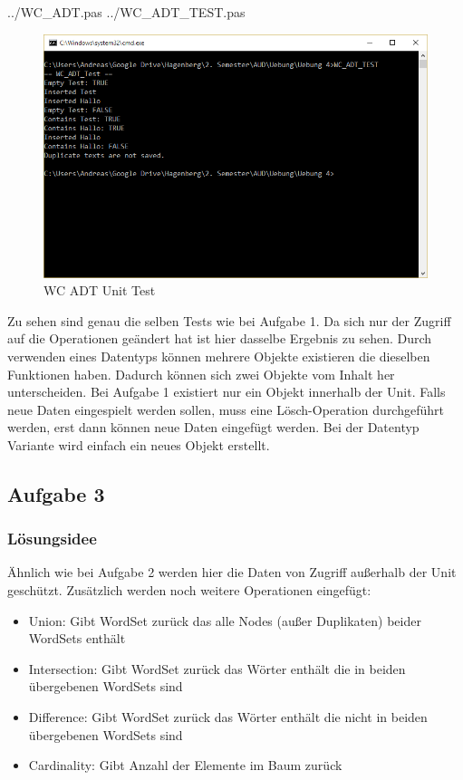 \documentclass[a4papr,12pt]{article}
\begin{document}
 {../WC_ADT.pas}
\newpage
 {../WC_ADT_TEST.pas}
\begin{figure}[H]
	\centering
	\includegraphics[scale=0.8]{./pictures/2.png}
	\caption{WC ADT Unit Test}
	\label{fig: Matching}
\end{figure}
\raggedright
Zu sehen sind genau die selben Tests wie bei Aufgabe 1. Da sich nur der Zugriff auf die Operationen geändert hat ist hier dasselbe Ergebnis zu sehen. Durch verwenden eines Datentyps können mehrere Objekte existieren die dieselben Funktionen haben. Dadurch können sich zwei Objekte vom Inhalt her unterscheiden. Bei Aufgabe 1 existiert nur ein Objekt innerhalb der Unit. Falls neue Daten eingespielt werden sollen, muss eine Lösch-Operation durchgeführt werden, erst dann können neue Daten eingefügt werden. Bei der Datentyp Variante wird einfach ein neues Objekt erstellt.
\newpage
\subsection*{Aufgabe 3}
\subsubsection*{Lösungsidee}
Ähnlich wie bei Aufgabe 2 werden hier die Daten von Zugriff außerhalb der Unit geschützt. Zusätzlich werden noch weitere Operationen eingefügt:
  \begin{itemize}
\item Union:  \newline Gibt WordSet zurück das alle Nodes (außer Duplikaten) beider WordSets enthält  
\item Intersection:   \newline Gibt WordSet zurück das Wörter enthält die in beiden übergebenen 			WordSets sind
\item Difference:   \newline Gibt WordSet zurück das Wörter enthält die nicht in beiden übergebenen
	WordSets sind
\item Cardinality:  \newline Gibt Anzahl der Elemente im Baum zurück
\end{itemize} 
\end{document}
